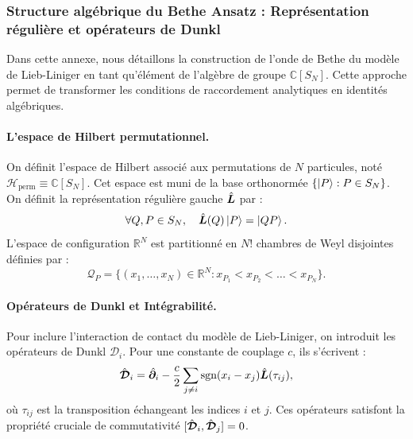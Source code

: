 
\subsubsection{Structure algébrique du Bethe Ansatz : Représentation régulière et opérateurs de Dunkl}
\label{annexe:dunkl_bethe}

Dans cette annexe, nous détaillons la construction de l'onde de Bethe du modèle de Lieb-Liniger en tant qu'élément de l'algèbre de groupe $\mathbb{C}[S_N]$. Cette approche permet de transformer les conditions de raccordement analytiques en identités algébriques.

\paragraph{L'espace de Hilbert permutationnel.}

On définit l'espace de Hilbert associé aux permutations de $N$ particules, noté $\mathcal{H}_{\text{perm}} \equiv \mathbb{C}[S_N]$. Cet espace est muni de la base orthonormée $\{ \ket{P} : P \in S_N \}$. On définit la représentation régulière gauche $\hat{\bm{L}}$ par :
\begin{equation}
    \forall Q, P \in S_N, \quad \hat{\bm{L}}(Q) \ket{P} = \ket{QP}.
\end{equation}
L'espace de configuration $\mathbb{R}^N$ est partitionné en $N!$ chambres de Weyl disjointes définies par :
\begin{equation}
    \mathcal{Q}_P = \{ (x_1, \dots, x_N) \in \mathbb{R}^N : x_{P_1} < x_{P_2} < \dots < x_{P_N} \}.
\end{equation}

\paragraph{Opérateurs de Dunkl et Intégrabilité.}

Pour inclure l'interaction de contact du modèle de Lieb-Liniger, on introduit les opérateurs de Dunkl $\mathcal{D}_i$. Pour une constante de couplage $c$, ils s'écrivent :
\begin{equation}
    \hat{\bm{\mathcal{D}}}_i = \hat{\bm{\partial}}_i - \frac{c}{2} \sum_{j \neq i} \text{sgn}(x_i - x_j) \hat{\bm{L}}(\tau_{ij}),
\end{equation}
où $\tau_{ij}$ est la transposition échangeant les indices $i$ et $j$. Ces opérateurs satisfont la propriété cruciale de commutativité $[\hat{\bm{\mathcal{D}}}_i, \hat{\bm{\mathcal{D}}}_j] = 0$.

